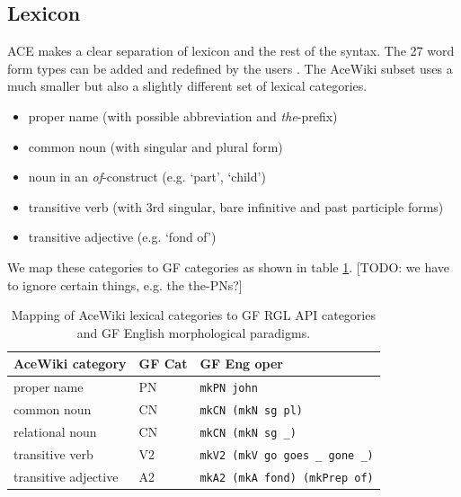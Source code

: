 \documentclass[a4paper]{article}
\def\xp#1{\texttt{#1}}
\begin{document}
\subsection{Lexicon}

ACE makes a clear separation of lexicon and the rest of the syntax.
The 27 word form types can be added and redefined by the users
\cite{ACE_6.6_Lexicon_Specification}. The AceWiki subset uses a much smaller
but also a slightly different set of lexical categories.

\begin{itemize}
\item proper name (with possible abbreviation and \emph{the}-prefix)
\item common noun (with singular and plural form)
\item noun in an \emph{of}-construct (e.g. `part', `child')
\item transitive verb (with 3rd singular, bare infinitive and past participle
forms)
\item transitive adjective (e.g. `fond of')
\end{itemize}

We map these categories to GF categories as shown in
table \ref{mapping_acewiki_to_gf}.
[TODO: we have to ignore certain things, e.g.  the the-PNs?]

\begin{table}
\begin{center}
\caption{Mapping of AceWiki lexical categories
to GF RGL API categories and GF English
morphological paradigms.\protect\label{mapping_acewiki_to_gf}}
\begin{tabular}{ l l l }
\hline
AceWiki category & GF Cat & GF Eng oper \\
\hline
proper name & PN & \xp{mkPN john} \\
common noun & CN & \xp{mkCN (mkN sg pl)} \\
relational noun & CN & \xp{mkCN (mkN sg \_)} \\
transitive verb & V2 & \xp{mkV2 (mkV go goes \_ gone \_)} \\
transitive adjective & A2 & \xp{mkA2 (mkA fond) (mkPrep of)} \\
\hline
\end{tabular}
\end{center}
\end{table}

%
%
\end{document}
